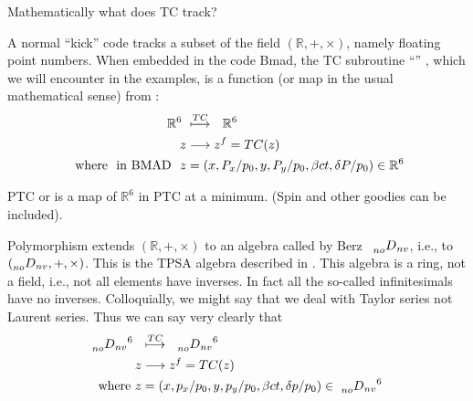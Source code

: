 \documentclass{hitec}     %
\begin{document}
{{{Mathematically what does TC track?

A normal ``kick'' code tracks a subset of the field $(\mathbb{R},+,\times)$, namely floating point numbers. When embedded in the code Bmad, the TC subroutine ``'' , which we will encounter in the examples, is a function (or map in the usual mathematical sense) from :
%
\begin{align} {{\mathbb{R}}}^{6}\ &\stackrel{TC}{\longmapsto}\ \ {{\mathbb{R}}}^{6} \\  z &\longrightarrow {z}^{f}=TC(z) \\~{\rm w}{\rm h}{\rm e}{\rm r}{\rm e}~~{\rm i}{\rm n}~{\rm B}{\rm M}{\rm A}{\rm D}~~z&=
\left({x,{P}_{x}/{p}_{0},y,{P}_{y}/{p}_{0},\beta ct,\delta P/{p}_{0}}\right)\in {{\mathbb{R}}}^{6}\end{align}


PTC or   is a map of  ${{\mathbb{R}}}^{6}$ in PTC at a minimum. (Spin and other goodies can be included).

Polymorphism extends $(\mathbb{R},+,\times)$ to an algebra called by Berz\cite{theberzbook} ~$\prescript{}{no}{D}_{nv} $, i.e., to $(\prescript{}{no}{D}_{nv} ,+,\times )$. This is the TPSA algebra described in  . This algebra is a ring, not a field, i.e., not all elements have inverses. In fact all the so-called infinitesimals have no inverses. Colloquially, we might say that we deal with Taylor series not Laurent series. Thus we can say very clearly that 
%
\begin{align}  {\prescript{}{no}{D}_{nv}}^{6}\ \ &\stackrel{TC}{\longmapsto}\ \ {\prescript{}{no}{D}_{nv}}^{6}  \\  z &\longrightarrow {z}^{f}=TC(z) \label{eq:ptcmap}\\~{\rm w}{\rm h}{\rm e}{\rm r}{\rm e}~z&=
\left({x,{p}_{x}/{p}_{0},y,{p}_{y}/{p}_{0},\beta ct,\delta p/{p}_{0}}\right)\in \ {\prescript{}{no}{D}_{nv}}^{6}\end{align}

}}}
\end{document}
